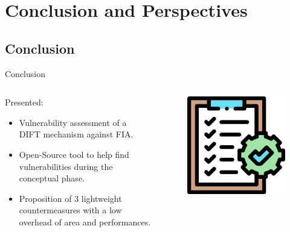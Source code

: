 \section{Conclusion and Perspectives}


\subsection{Conclusion}
\begin{frame}{Conclusion}
    \begin{columns}
        \begin{column}{.7\linewidth}
            \begin{block}{Presented:}
                \begin{itemize}
                    [triangle]
                    \item Vulnerability assessment of a DIFT mechanism against FIA.
                    \item Open-Source tool to help find vulnerabilities during the conceptual phase.
                    \item Proposition of 3 lightweight countermeasures with a low overhead of area and performances.
                \end{itemize}
            \end{block}
        \end{column}
        \begin{column}{.3\linewidth}
            \begin{figure}
                \centering
                \includegraphics[height=.25\textheight]{src/6_conclusion/img/conclusion.png}
            \end{figure}
        \end{column}
    \end{columns}
    

\end{frame}
